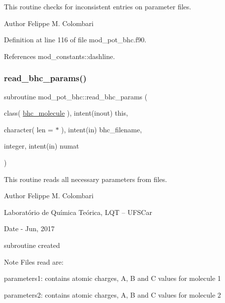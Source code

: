 This routine checks for inconsistent entries on parameter files. 

\begin{DoxyAuthor}{Author}
Felippe M. Colombari 
\end{DoxyAuthor}


Definition at line 116 of file mod\+\_\+pot\+\_\+bhc.\+f90.



References mod\+\_\+constants\+::dashline.

\mbox{\label{namespacemod__pot__bhc_ab1ca15618078c0662d799fc22b126e17}} 
\subsubsection{\texorpdfstring{read\+\_\+bhc\+\_\+params()}{read\_bhc\_params()}}
{\footnotesize\ttfamily subroutine mod\+\_\+pot\+\_\+bhc\+::read\+\_\+bhc\+\_\+params (\begin{DoxyParamCaption}\item[{class( \hyperlink{structmod__pot__bhc_1_1bhc__molecule}{bhc\+\_\+molecule} ), intent(inout)}]{this,  }\item[{character( len = $\ast$ ), intent(in)}]{bhc\+\_\+filename,  }\item[{integer, intent(in)}]{numat }\end{DoxyParamCaption})}



This routine reads all necessary parameters from files. 

\begin{DoxyAuthor}{Author}
Felippe M. Colombari
\begin{DoxyItemize}
\item Laboratório de Química Teórica, L\+QT -- U\+F\+S\+Car 
\end{DoxyItemize}
\end{DoxyAuthor}
\begin{DoxyDate}{Date}
-\/ Jun, 2017
\begin{DoxyItemize}
\item subroutine created 
\end{DoxyItemize}
\end{DoxyDate}
\begin{DoxyNote}{Note}
Files read are\+:~\newline

\begin{DoxyItemize}
\item parameters1\+: contains atomic charges, A, B and C values for molecule 1
\item parameters2\+: contains atomic charges, A, B and C values for molecule 2 
\end{DoxyItemize}
\end{DoxyNote}


